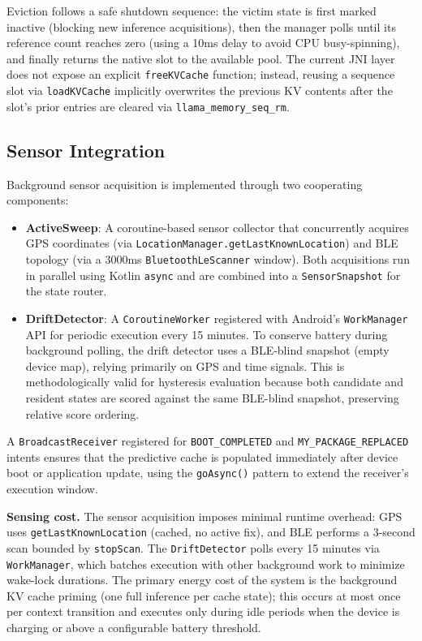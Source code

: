 \documentclass[journal]{IEEEtran}
\begin{document}
Eviction follows a safe shutdown sequence: the victim state is first marked inactive (blocking new inference acquisitions), then the manager polls until its reference count reaches zero (using a 10ms delay to avoid CPU busy-spinning), and finally returns the native slot to the available pool. The current JNI layer does not expose an explicit \texttt{freeKVCache} function; instead, reusing a sequence slot via \texttt{loadKVCache} implicitly overwrites the previous KV contents after the slot's prior entries are cleared via \texttt{llama\_memory\_seq\_rm}.

\subsection{Sensor Integration}
\label{sec:sensors}

Background sensor acquisition is implemented through two cooperating components:

\begin{itemize}
    \item \textbf{ActiveSweep}: A coroutine-based sensor collector that concurrently acquires GPS coordinates (via \texttt{LocationManager.getLastKnownLocation}) and BLE topology (via a 3000ms \texttt{BluetoothLeScanner} window). Both acquisitions run in parallel using Kotlin \texttt{async} and are combined into a \texttt{SensorSnapshot} for the state router.

    \item \textbf{DriftDetector}: A \texttt{CoroutineWorker} registered with Android's \texttt{WorkManager} API for periodic execution every 15 minutes. To conserve battery during background polling, the drift detector uses a BLE-blind snapshot (empty device map), relying primarily on GPS and time signals. This is methodologically valid for hysteresis evaluation because both candidate and resident states are scored against the same BLE-blind snapshot, preserving relative score ordering.
\end{itemize}

A \texttt{BroadcastReceiver} registered for \texttt{BOOT\_COMPLETED} and \texttt{MY\_PACKAGE\_REPLACED} intents ensures that the predictive cache is populated immediately after device boot or application update, using the \texttt{goAsync()} pattern to extend the receiver's execution window.

\textbf{Sensing cost.} The sensor acquisition imposes minimal runtime overhead: GPS uses \texttt{getLastKnownLocation} (cached, no active fix), and BLE performs a 3-second scan bounded by \texttt{stopScan}. The \texttt{DriftDetector} polls every 15 minutes via \texttt{WorkManager}, which batches execution with other background work to minimize wake-lock durations. The primary energy cost of the system is the background KV cache priming (one full inference per cache state); this occurs at most once per context transition and executes only during idle periods when the device is charging or above a configurable battery threshold.
\end{document}
